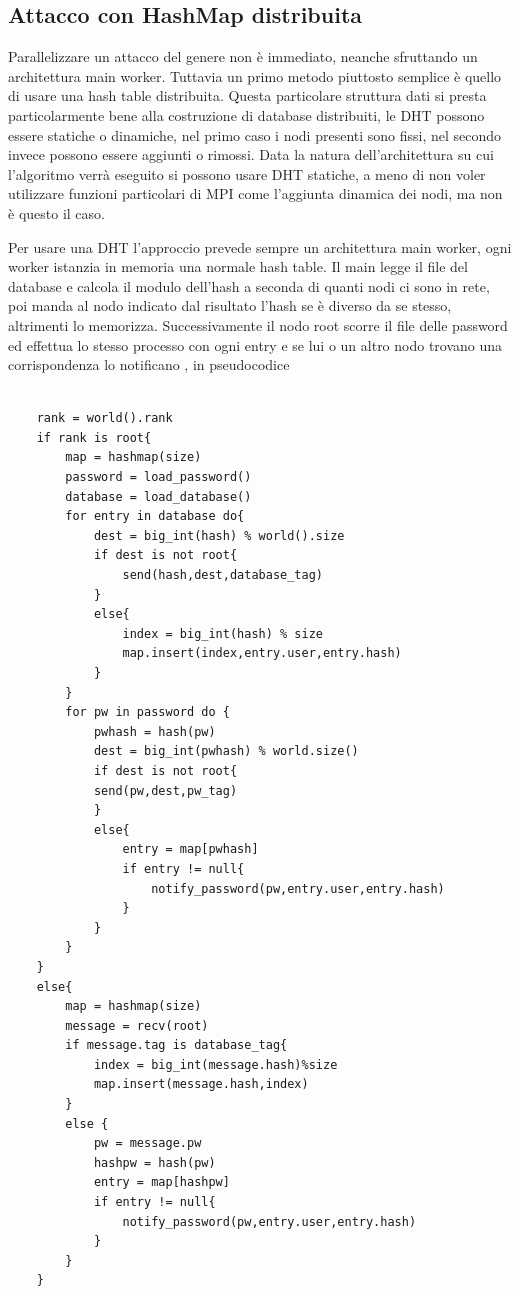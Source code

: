 \subsection{Attacco con HashMap distribuita}
Parallelizzare un attacco del genere non è immediato, neanche sfruttando un architettura main worker. Tuttavia un primo metodo piuttosto semplice è quello di usare una hash table distribuita. Questa particolare struttura dati si presta particolarmente bene alla costruzione di database distribuiti, le DHT possono essere statiche o dinamiche, nel primo caso i nodi presenti sono fissi, nel secondo invece possono essere aggiunti o rimossi. Data la natura dell'architettura su cui l'algoritmo verrà eseguito si possono usare DHT statiche, a meno di non voler utilizzare funzioni particolari di MPI come l'aggiunta dinamica dei nodi, ma non è questo il caso.

Per usare una DHT l'approccio prevede sempre un architettura main worker, ogni worker istanzia in memoria una normale hash table. Il main legge il file del database e calcola il modulo dell'hash a seconda di quanti nodi ci sono in rete, poi manda al nodo indicato dal risultato l'hash se è diverso da se stesso, altrimenti lo memorizza. Successivamente il nodo root scorre il file delle password ed effettua lo stesso processo con ogni entry e se lui o un altro nodo trovano una corrispondenza lo notificano , in pseudocodice

\begin{lstlisting}

    rank = world().rank 
    if rank is root{
        map = hashmap(size)
        password = load_password()
        database = load_database()
        for entry in database do{
            dest = big_int(hash) % world().size
            if dest is not root{
                send(hash,dest,database_tag)
            }
            else{
                index = big_int(hash) % size
                map.insert(index,entry.user,entry.hash)
            }
        }
        for pw in password do {
            pwhash = hash(pw)
            dest = big_int(pwhash) % world.size()
            if dest is not root{
            send(pw,dest,pw_tag)
            }
            else{
                entry = map[pwhash]
                if entry != null{
                    notify_password(pw,entry.user,entry.hash)
                }
            }
        }
    }
    else{
        map = hashmap(size)
        message = recv(root)
        if message.tag is database_tag{
            index = big_int(message.hash)%size
            map.insert(message.hash,index)
        }
        else {
            pw = message.pw 
            hashpw = hash(pw)
            entry = map[hashpw]
            if entry != null{
                notify_password(pw,entry.user,entry.hash)
            }
        }
    }
\end{lstlisting}


